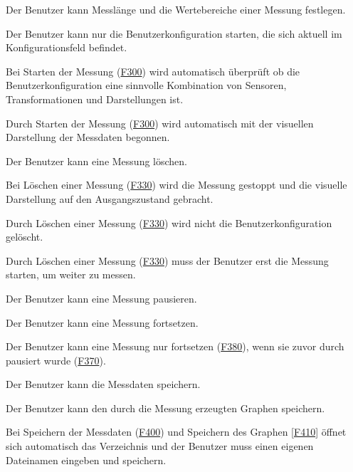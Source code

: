 \documentclass[parskip=full]{scrartcl}
\begin{document}
\begin{description}

\hypertarget{link-f290}{\item[F290]} Der Benutzer kann Messlänge und die Wertebereiche einer Messung festlegen.
\hypertarget{link-f300}{\item[F300]} Der Benutzer kann nur die \gls{Benutzerkonfiguration} starten, die sich aktuell im Konfigurationsfeld befindet.
\hypertarget{link-f310}{\item[F310]} Bei Starten der Messung (\hyperlink{link-f300}{F300}) wird automatisch überprüft ob die \gls{Benutzerkonfiguration} eine sinnvolle Kombination von Sensoren, Transformationen und Darstellungen ist.
\hypertarget{link-f320}{\item[F320]} Durch Starten der Messung (\hyperlink{link-f300}{F300}) wird automatisch mit der visuellen Darstellung der Messdaten begonnen.
\hypertarget{link-f330}{\item[F330]} Der Benutzer kann eine Messung löschen.
\hypertarget{link-f340}{\item[F340]} Bei Löschen einer Messung (\hyperlink{link-f330}{F330}) wird die Messung gestoppt und die visuelle Darstellung auf den Ausgangszustand gebracht.
\hypertarget{link-f350}{\item[F350]} Durch Löschen einer Messung (\hyperlink{link-f330}{F330}) wird nicht die \gls{Benutzerkonfiguration} gelöscht.
\hypertarget{link-f360}{\item[F360]} Durch Löschen einer Messung (\hyperlink{link-f330}{F330}) muss der Benutzer erst die Messung starten, um weiter zu messen.
\hypertarget{link-f370}{\item[F370]} Der Benutzer kann eine Messung pausieren.
\hypertarget{link-f380}{\item[F380]} Der Benutzer kann eine Messung fortsetzen.
\hypertarget{link-f390}{\item[F390]} Der Benutzer kann eine Messung nur fortsetzen (\hyperlink{link-f380}{F380}), wenn sie zuvor durch pausiert wurde (\hyperlink{link-f370}{F370}).
\hypertarget{link-f400}{\item[F400]} Der Benutzer kann die Messdaten speichern.
\hypertarget{link-f410}{\item[F410]} Der Benutzer kann den durch die Messung erzeugten Graphen speichern.
\hypertarget{link-f420}{\item[F420]} Bei Speichern der Messdaten (\hyperlink{link-f400}{F400}) und Speichern des Graphen [\hyperlink{link-f410}{F410}] öffnet sich automatisch das Verzeichnis und der Benutzer muss einen eigenen Dateinamen eingeben und speichern. 

\end{description}
\end{document}
